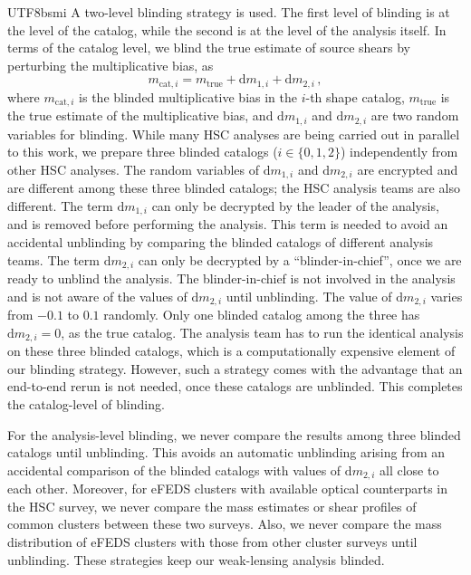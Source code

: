\documentclass[longauth]{aa}
\newcommand{\dif}{\ensuremath{\mathrm{d}}}
\begin{document}
\begin{CJK*}{UTF8}{bsmi}
A two-level blinding strategy is used.
The first level of blinding is at the level of the catalog, while the second is at the level of the analysis itself.
In terms of the catalog level, we blind the true estimate of source shears by perturbing the multiplicative bias, as
%
\begin{equation}
\label{eq:multiplicative_bias_blinding}
m_{\mathrm{cat}, i} = m_{\mathrm{true}} + \dif m_{1,i} + \dif m_{2,i} \, ,
\end{equation}
% 
where $m_{\mathrm{cat}, i}$ is the blinded multiplicative bias in the $i$-th shape catalog, $m_{\mathrm{true}}$ is the true estimate of the multiplicative bias, and $\dif m_{1,i}$ and $\dif m_{2,i}$ are two random variables for blinding.
While many HSC analyses are being carried out in parallel to this work, we prepare three blinded catalogs ($i\in\{0,1,2\}$) independently from other HSC analyses.
The random variables of $\dif m_{1,i}$ and $\dif m_{2,i}$ are encrypted and are different among these three blinded catalogs; the HSC analysis teams are also different.
The term $\dif m_{1,i}$ can only be decrypted by the leader of the analysis, and is removed before performing the analysis.
This term is needed to avoid an accidental unblinding by comparing the blinded catalogs of different analysis teams.
The term $\dif m_{2,i}$ can only be decrypted by a ``blinder-in-chief'', once we are ready to unblind the analysis.
The blinder-in-chief is not involved in the analysis and is not aware of the values of $\dif m_{2,i}$  until unblinding.
The value of $\dif m_{2,i}$ varies from $-0.1$ to $0.1$ randomly.
Only one blinded catalog among the three has $\dif m_{2,i}=0$, as the true catalog. 
The analysis team has to run the identical analysis on these three blinded catalogs, which is a computationally expensive element of our blinding strategy.
However, such a strategy comes with the advantage that an end-to-end rerun is not needed, once these catalogs are unblinded.
This completes the catalog-level of blinding.

For the analysis-level blinding, we never compare the results among three blinded catalogs until unblinding.
This avoids an automatic unblinding arising from an accidental comparison of the blinded catalogs with values of $\dif m_{2,i}$ all close to each other.
Moreover, for eFEDS clusters with available optical counterparts in the HSC survey, we never compare the mass estimates or shear profiles of common clusters between these two surveys.
Also, we never compare the mass distribution of eFEDS clusters with those from other cluster surveys until unblinding.
These strategies keep our weak-lensing analysis blinded.


\end{CJK*}
\end{document}

